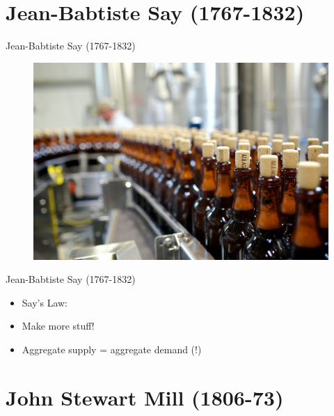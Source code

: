 \documentclass{beamer}
\begin{document}
\section{Jean-Babtiste Say (1767-1832)}

\begin{frame}{Jean-Babtiste Say (1767-1832)}
\begin{figure}[htpb]
	\centering
	\includegraphics[width=1\linewidth]{../img/beer.jpg}
\end{figure}
\end{frame}

\begin{frame}{Jean-Babtiste Say (1767-1832)}
    \begin{itemize}[<+- | alert@+>]
    \item Say's Law:
    \item Make more stuff!
    \item Aggregate supply = aggregate demand (!)
    \end{itemize}    
\end{frame}{}

\section{John Stewart Mill (1806-73)}
\end{document}

